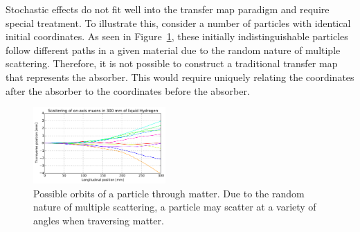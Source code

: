 \documentclass{jacow}
\begin{document}
Stochastic effects do not fit well into the transfer map paradigm and require special treatment. To illustrate this, consider a number of particles with identical initial coordinates. As seen in Figure~\ref{fig:mult_scattering}, these initially indistinguishable particles follow different paths in a given material due to the random nature of multiple scattering. Therefore, it is not possible to construct a traditional transfer map that represents the absorber. This would require uniquely relating the coordinates after the absorber to the coordinates before the absorber.

\begin{figure}[htb]
\centering
\includegraphics[width=0.45\textwidth]{figures/p10tr.pdf}
\caption{Possible orbits of a particle through matter. Due to the random nature of multiple scattering, a particle may scatter at a variety of angles when traversing matter.}
\label{fig:mult_scattering}
\end{figure}

\end{document}
